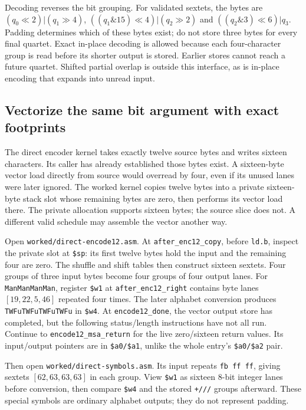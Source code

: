

Decoding reverses the bit grouping. For validated sextets, the bytes are
$(q_0\ll2)|(q_1\gg4)$, $((q_1\mathbin{\&}15)\ll4)|(q_2\gg2)$ and
$((q_2\mathbin{\&}3)\ll6)|q_3$. Padding determines which of these bytes
exist; do not store three bytes for every final quartet. Exact in-place decoding
is allowed because each four-character group is read before its shorter output
is stored. Earlier stores cannot reach a future quartet. Shifted partial overlap
is outside this interface, as is in-place encoding that expands into unread input.

\subsection*{Vectorize the same bit argument with exact footprints}

The direct encoder kernel takes exactly twelve source bytes and writes sixteen
characters. Its caller has already established those bytes exist. A sixteen-byte
vector load directly from source would overread by four, even if its unused
lanes were later ignored. The worked kernel copies twelve bytes into a private
sixteen-byte stack slot whose remaining bytes are zero, then performs its vector
load there. The private allocation supports sixteen bytes; the source slice does
not. A different valid schedule may assemble the vector another way.

Open \texttt{worked/direct-encode12.asm}. At \texttt{after\_enc12\_copy},
before \texttt{ld.b}, inspect the private slot at \texttt{\$sp}: its first
twelve bytes hold the input and the remaining four are zero. The shuffle and
shift tables then construct sixteen sextets. Four groups of three
input bytes become four groups of four output lanes. For \texttt{ManManManMan},
register \texttt{\$w1} at \texttt{after\_enc12\_right} contains byte lanes
$[19,22,5,46]$ repeated four times. The later alphabet conversion produces
\texttt{TWFuTWFuTWFuTWFu} in \texttt{\$w4}. At \texttt{encode12\_done},
the vector output store has completed, but the following status/length
instructions have not all run. Continue to \texttt{encode12\_msa\_return}
for the live zero/sixteen return values. Its input/output pointers are
in \texttt{\$a0/\$a1}, unlike the whole entry's \texttt{\$a0/\$a2} pair.



Then open \texttt{worked/direct-symbols.asm}. Its input repeats
\texttt{fb ff ff}, giving sextets $[62,63,63,63]$ in each group. View
\texttt{\$w1} as sixteen 8-bit integer lanes before conversion, then compare
\texttt{\$w4} and the stored \texttt{+///} groups afterward. These special
symbols are ordinary alphabet outputs; they do not represent padding.

